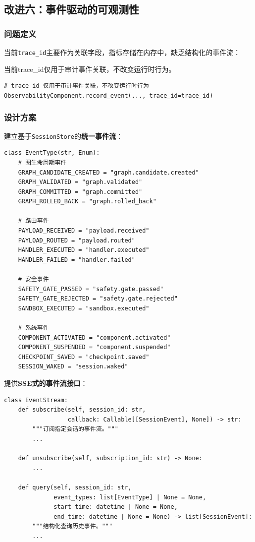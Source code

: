 \documentclass[12pt,a4paper]{ctexart}
\begin{document}
\subsection{改进六：事件驱动的可观测性}

\subsubsection{问题定义}

当前\texttt{trace\_id}主要作为关联字段，指标存储在内存中，缺乏结构化的事件流：

当前trace\_id仅用于审计事件关联，不改变运行时行为。

\begin{lstlisting}[caption={}]
# trace_id 仅用于审计事件关联，不改变运行时行为
ObservabilityComponent.record_event(..., trace_id=trace_id)
\end{lstlisting}

\subsubsection{设计方案}

建立基于\texttt{SessionStore}的\textbf{统一事件流}：

\begin{lstlisting}[caption={结构化事件类型}]
class EventType(str, Enum):
    # 图生命周期事件
    GRAPH_CANDIDATE_CREATED = "graph.candidate.created"
    GRAPH_VALIDATED = "graph.validated"
    GRAPH_COMMITTED = "graph.committed"
    GRAPH_ROLLED_BACK = "graph.rolled_back"

    # 路由事件
    PAYLOAD_RECEIVED = "payload.received"
    PAYLOAD_ROUTED = "payload.routed"
    HANDLER_EXECUTED = "handler.executed"
    HANDLER_FAILED = "handler.failed"

    # 安全事件
    SAFETY_GATE_PASSED = "safety.gate.passed"
    SAFETY_GATE_REJECTED = "safety.gate.rejected"
    SANDBOX_EXECUTED = "sandbox.executed"

    # 系统事件
    COMPONENT_ACTIVATED = "component.activated"
    COMPONENT_SUSPENDED = "component.suspended"
    CHECKPOINT_SAVED = "checkpoint.saved"
    SESSION_WAKED = "session.waked"
\end{lstlisting}

提供\textbf{SSE式的事件流接口}：

\begin{lstlisting}[caption={事件流接口}]
class EventStream:
    def subscribe(self, session_id: str,
                  callback: Callable[[SessionEvent], None]) -> str:
        """订阅指定会话的事件流。"""
        ...

    def unsubscribe(self, subscription_id: str) -> None:
        ...

    def query(self, session_id: str,
              event_types: list[EventType] | None = None,
              start_time: datetime | None = None,
              end_time: datetime | None = None) -> list[SessionEvent]:
        """结构化查询历史事件。"""
        ...
\end{lstlisting}
\end{document}
